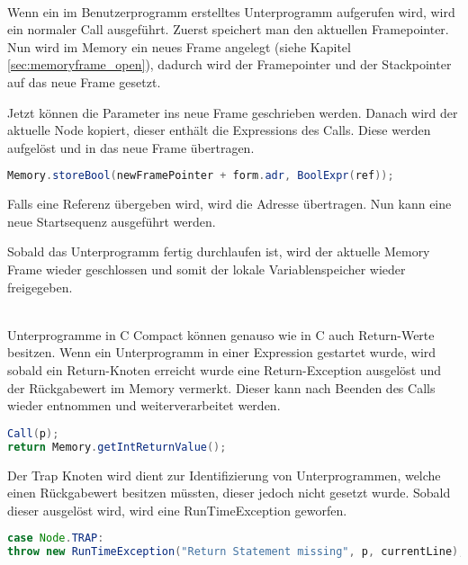 \\
Wenn ein im Benutzerprogramm erstelltes Unterprogramm aufgerufen wird, wird ein normaler Call ausgeführt. Zuerst speichert man den aktuellen Framepointer. Nun wird im Memory ein neues Frame angelegt (siehe Kapitel \ref{sec:memoryframe_open}), dadurch wird der Framepointer und der Stackpointer auf das neue Frame gesetzt.

Jetzt können die Parameter ins neue Frame geschrieben werden. Danach wird der aktuelle Node kopiert, dieser enthält die Expressions des Calls. Diese werden aufgelöst und in das neue Frame übertragen. 
\begin{lstlisting}[language=JAVA]
Memory.storeBool(newFramePointer + form.adr, BoolExpr(ref));
\end{lstlisting}
Falls eine Referenz übergeben wird, wird die Adresse übertragen. Nun kann eine neue Startsequenz ausgeführt werden.

Sobald das Unterprogramm fertig durchlaufen ist, wird der aktuelle Memory Frame wieder geschlossen und somit der lokale Variablenspeicher wieder freigegeben.

\\
Unterprogramme in C Compact können genauso wie in C auch Return-Werte besitzen. Wenn ein Unterprogramm in einer Expression gestartet wurde, wird sobald ein Return-Knoten erreicht wurde eine Return-Exception ausgelöst und der Rückgabewert im Memory vermerkt. Dieser kann nach Beenden des Calls wieder entnommen und weiterverarbeitet werden.
\begin{lstlisting}[language=JAVA]
Call(p);
return Memory.getIntReturnValue();	
\end{lstlisting}

Der Trap Knoten wird dient zur Identifizierung von Unterprogrammen, welche einen Rückgabewert besitzen müssten, dieser jedoch nicht gesetzt wurde. Sobald dieser ausgelöst wird, wird eine RunTimeException geworfen.
\begin{lstlisting}[language=JAVA]
case Node.TRAP:
throw new RunTimeException("Return Statement missing", p, currentLine); 
\end{lstlisting}
